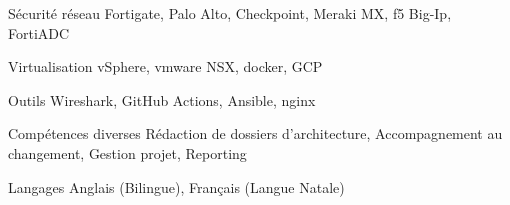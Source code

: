 

\begin{cvskills}

  \cvskill
    {Sécurité réseau} %
    {Fortigate, Palo Alto, Checkpoint, Meraki MX, f5 Big-Ip, FortiADC} %

  \cvskill
    {Virtualisation} %
    {vSphere, vmware NSX, docker, GCP} %

  \cvskill
    {Outils} %
    {Wireshark, GitHub Actions, Ansible, nginx} %

  \cvskill
    {Compétences diverses} %
    {Rédaction de dossiers d'architecture, Accompagnement au changement, Gestion projet, Reporting} %

  \cvskill
    {Langages} %
    {Anglais (Bilingue), Français (Langue Natale)} %

\end{cvskills}
